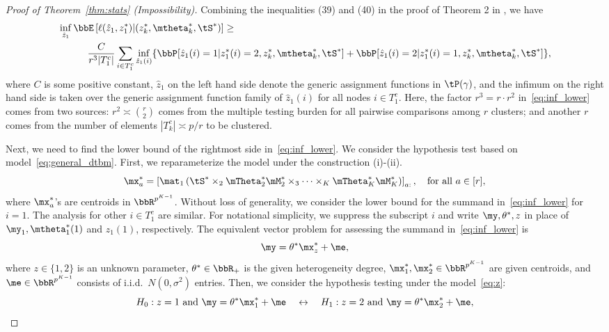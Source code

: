 \documentclass[lettersize,onecolumn,journal]{IEEEtran}
\theoremstyle{definition}
\theoremstyle{definition}
\newcommand{\of}[1]{\left(#1\right)}
\newcommand{\off}[1]{\left[#1\right]}
\begin{document}
{\begin{proof}[Proof of Theorem~\ref{thm:stats} (Impossibility)]
   Combining the inequalities (39) and (40) in the proof of Theorem 2 in \cite{gao2018community}, we have 
   \begin{align}
        & \inf_{\hat z_1 } \bbE \left[ \ell(\hat z_1, z_1^*) | (z^*_k, \mtheta^*_k, \tS^*)  \right] \geq  \\
        & \quad \quad \quad \frac{C}{r^3 |T_1^c|} \sum_{i \in T_1^c} \inf_{\hat z_1  (i)} \{ \bbP[\hat z_1(i) = 1| z_1^*(i) = 2, z_k^*, \mtheta_k^*, \tS^*] +   \bbP[\hat z_1(i) = 2| z_1^*(i) = 1, z_k^*, \mtheta_k^*, \tS^*] \},\label{eq:inf_lower}
   \end{align}
   where $C$ is some positive constant,  $\hat z_1$ on the left hand side denote the generic assignment functions in $\tP(\gamma)$, and the infimum on the right hand side is taken over the generic assignment function family of $\hat z_1(i)$ for all nodes $i \in T_1^c$. Here, the factor $r^3=r\cdot r^2$ in~\eqref{eq:inf_lower} comes from two sources: $r^2\asymp {r\choose 2}$ comes from the multiple testing burden for all pairwise comparisons among $r$ clusters; and another $r$ comes from the number of elements $|T^c_k|\asymp p/r$ to be clustered. 
   
   Next, we need to find the lower bound of the rightmost side in~\eqref{eq:inf_lower}. 
We consider the hypothesis test based on model~\eqref{eq:general_dtbm}. First, we reparameterize the model under the construction (i)-(ii).
\begin{equation}
    \mx_a^* = \off{\mat_1 \of{ \tS^*\times_2 \mTheta_2^* \mM_2^*\times_3\cdots \times_K \mTheta^*_K \mM_K^* }}_{a:}, \quad \text{for all} \ a \in [r],
\end{equation}
where $\mx_a^*$'s are centroids in $\bbR^{p^{K-1}}$. Without loss of generality, we consider the lower bound for the summand in~\eqref{eq:inf_lower} for $i=1$. The analysis for other $i\in T^c_1$ are similar. For notational simplicity, we suppress the subscript $i$ and write $\my, \theta^*, z$ in place of $\my_1, \mtheta_1^*(1)$ and $z_1(1)$, respectively. The equivalent vector problem for assessing the summand in~\eqref{eq:inf_lower} is
\begin{equation}\label{eq:z}
\my=\theta^* \mx_{z}^*+\me,
\end{equation}
where $z\in \{1,2\}$ is an unknown parameter, $\theta^* \in \bbR_+$ is the given heterogeneity degree, $\mx_1^*,\mx_2^*\in\bbR^{p^{K-1}}$ are given centroids, and $\me\in\bbR^{p^{K-1}}$ consists of i.i.d.\ $N(0,\sigma^2)$ entries.  Then, we consider the hypothesis testing under the model~\eqref{eq:z}:
\begin{equation}\label{eq:test}
 H_0: z = 1 \text{ and } \my = \theta^* \mx_1^* + \me \quad \leftrightarrow \quad H_1: z = 2 \text{ and } \my = \theta^* \mx_2^* + \me,
\end{equation}
   

\end{proof}}
\end{document}
